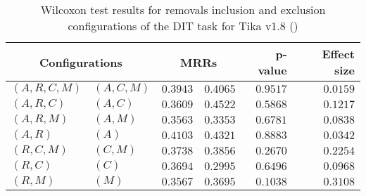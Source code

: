 
\begin{table}
\begin{spacing}{1.2}
\centering
\caption{Wilcoxon test results for removals inclusion and exclusion configurations of the DIT task for Tika v1.8 (\ctwo)}
\label{table:versus-wilcox-tika-dit-removals}
\begin{tabular}{ll|rr|rr}
\toprule
      \multicolumn{2}{c|}{Configurations} &                \multicolumn{2}{c|}{MRRs} &             p-value & Effect size \\
\midrule
 $(A,R,C,M)$ &  $(A,C,M)$ &       $0.3943$ &  $\bm{0.4065}$ & $0.9517$ &    $0.0159$ \\
   $(A,R,C)$ &    $(A,C)$ &       $0.3609$ &  $\bm{0.4522}$ & $0.5868$ &    $0.1217$ \\
   $(A,R,M)$ &    $(A,M)$ &  $\bm{0.3563}$ &       $0.3353$ & $0.6781$ &    $0.0838$ \\
     $(A,R)$ &      $(A)$ &       $0.4103$ &  $\bm{0.4321}$ & $0.8883$ &    $0.0342$ \\
   $(R,C,M)$ &    $(C,M)$ &       $0.3738$ &  $\bm{0.3856}$ & $0.2670$ &    $0.2254$ \\
     $(R,C)$ &      $(C)$ &  $\bm{0.3694}$ &       $0.2995$ & $0.6496$ &    $0.0968$ \\
     $(R,M)$ &      $(M)$ &       $0.3567$ &  $\bm{0.3695}$ & $0.1038$ &    $0.3108$ \\
\bottomrule
\end{tabular}

\end{spacing}
\end{table}


